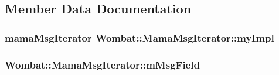 \subsection{Member Data Documentation}
\hypertarget{classWombat_1_1MamaMsgIterator_a26a128f59ba936caffd72fc477059b86}{
\subsubsection[{myImpl}]{\setlength{\rightskip}{0pt plus 5cm}mamaMsgIterator {\bf Wombat::MamaMsgIterator::myImpl}}}
\label{classWombat_1_1MamaMsgIterator_a26a128f59ba936caffd72fc477059b86}
\hypertarget{classWombat_1_1MamaMsgIterator_a9bf4ef87a3bc03de3850fb884ecbf74f}{
\subsubsection[{mMsgField}]{ {\bf Wombat::MamaMsgIterator::mMsgField}}}
\label{classWombat_1_1MamaMsgIterator_a9bf4ef87a3bc03de3850fb884ecbf74f}
